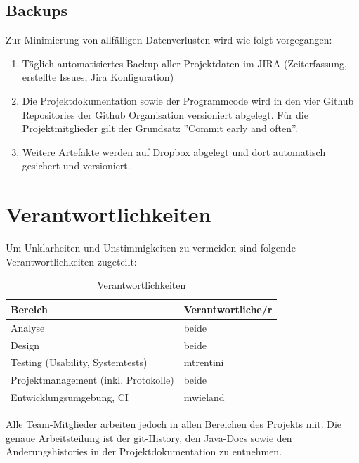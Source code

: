 \documentclass[11pt,a4paper,english,oneside]{book}
\numberwithin{equation}{chapter}
\begin{document}
	\subsection{Backups}
		\label{sec:backup}
		Zur Minimierung von allfälligen Datenverlusten wird wie folgt vorgegangen:
	
	\begin{enumerate}
		\item Täglich automatisiertes Backup aller Projektdaten im JIRA \cite{jira} (Zeiterfassung, erstellte Issues, Jira Konfiguration)
		\item Die Projektdokumentation sowie der Programmcode wird in den vier Github Repositories der Github Organisation \cite{github} versioniert abgelegt. Für die Projektmitglieder gilt der Grundsatz ''Commit early and often''.
		\item Weitere Artefakte werden auf Dropbox \cite{dropbox} abgelegt und dort automatisch gesichert und versioniert.
	\end{enumerate}
	
	\section{Verantwortlichkeiten}
	Um Unklarheiten und Unstimmigkeiten zu vermeiden sind folgende Verantwortlichkeiten zugeteilt:
	
		\begin{table}[h!]
		\centering
		\begin{tabular}{l l}
			\toprule 
			Bereich & Verantwortliche/r \\
			\toprule 
			Analyse & beide \\
			Design & beide \\ 
			Testing (Usability, Systemtests) & mtrentini \\
			Projektmanagement (inkl. Protokolle) & beide \\
			Entwicklungsumgebung, CI & mwieland \\
			\bottomrule 
		\end{tabular} 
		\caption{Verantwortlichkeiten} 
	\end{table}
	
	Alle Team-Mitglieder arbeiten jedoch in allen Bereichen des Projekts mit. 
	Die genaue Arbeitsteilung ist der git-History, den Java-Docs sowie den Änderungshistories in der Projektdokumentation zu entnehmen.
	
	\newpage
	
	\appendix
	\noappendicestocpagenum
	\addappheadtotoc
	\appendixpage
	
\end{document}

